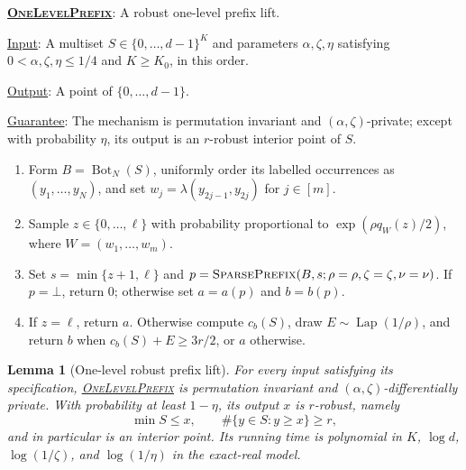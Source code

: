 \documentclass[11pt]{article}
\newenvironment{fminipage}%
  {\begin{Sbox}\begin{minipage}}%
  {\end{minipage}\end{Sbox}\fbox{\TheSbox}}
\newenvironment{algbox}[0]{%
\vskip 0.2in
\noindent
\begin{fminipage}{6.3in}
}{%
\end{fminipage}
\vskip 0.2in
}
\newtheorem{lemma}{Lemma}[section]
\begin{document}
\begin{algbox}
\textbf{\uline{\textsc{OneLevelPrefix}}}: A robust one-level prefix lift.
\label{alg:one-level-prefix}

\uline{Input}: A multiset $S\in\{0,\ldots,d-1\}^K$ and parameters
$\alpha,\zeta,\eta$ satisfying $0<\alpha,\zeta,\eta\le1/4$ and
$K\ge K_0$, in this order.

\uline{Output}: A point of $\{0,\ldots,d-1\}$.

\uline{Guarantee}: The mechanism is permutation invariant and
$(\alpha,\zeta)$-private; except with probability $\eta$, its output is an
$r$-robust interior point of $S$.

\begin{enumerate}[leftmargin=*,nosep]
  \item Form $B=\operatorname{Bot}_N(S)$, uniformly order its labelled
  occurrences as $(y_1,\ldots,y_N)$, and set
  $w_j=\lambda(y_{2j-1},y_{2j})$ for $j\in[m]$.
  \item Sample $z\in\{0,\ldots,\ell\}$ with probability proportional to
  $\exp(\rho q_W(z)/2)$, where $W=(w_1,\ldots,w_m)$.
  \item Set $s=\min\{z+1,\ell\}$ and
  $p=\text{\textsc{SparsePrefix}}(B,s;\rho=\rho,\zeta=\zeta,\nu=\nu)$.
  If $p=\bot$, return $0$;
  otherwise set $a=a(p)$ and $b=b(p)$.
  \item If $z=\ell$, return $a$.  Otherwise compute $c_b(S)$, draw
  $E\sim\operatorname{Lap}(1/\rho)$, and return $b$ when
  $c_b(S)+E\ge3r/2$, or $a$ otherwise.
\end{enumerate}
\end{algbox}

\begin{lemma}[One-level robust prefix lift]
\label{lem:one-level-prefix}
For every input satisfying its specification,
\hyperref[alg:one-level-prefix]{\textsc{OneLevelPrefix}} is permutation
invariant and $(\alpha,\zeta)$-differentially private.  With probability at
least $1-\eta$, its output $x$ is $r$-robust, namely
\[
 \min S\le x,
 \qquad
 \#\{y\in S:y\ge x\}\ge r,
\]
and in particular is an interior point.  Its running time is polynomial in
$K$, $\log d$, $\log(1/\zeta)$, and $\log(1/\eta)$ in the exact-real model.
\end{lemma}
\end{document}
